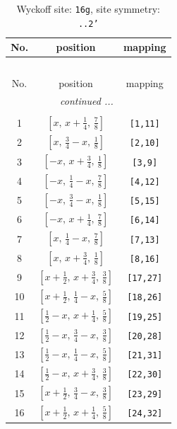 \documentclass[fleqn,8pt]{jsarticle}
\begin{document}
\renewcommand{\arraystretch}{1.2}
\begin{longtable}{ccc}
\caption{Wyckoff site: {\tt 16g}, site symmetry: {\tt ..2'}}
 \\
 \hline \hline
No. & position & mapping \\ \hline \endfirsthead

\multicolumn{2}{l}{\tablename\ \thetable{}} \\
 \hline \hline
No. & position & mapping \\ \hline \endhead

 \hline \hline
\multicolumn{2}{r}{\footnotesize\it continued ...} \\ \endfoot

 \hline \hline
\multicolumn{2}{r}{} \\ \endlastfoot

1 & $\left[ x,\, x + \frac{1}{4},\, \frac{7}{8} \right]$ & {\tt [1,11]} \\ \hline
2 & $\left[ x,\, \frac{3}{4} - x,\, \frac{1}{8} \right]$ & {\tt [2,10]} \\ \hline
3 & $\left[ - x,\, x + \frac{3}{4},\, \frac{1}{8} \right]$ & {\tt [3,9]} \\ \hline
4 & $\left[ - x,\, \frac{1}{4} - x,\, \frac{7}{8} \right]$ & {\tt [4,12]} \\ \hline
5 & $\left[ - x,\, \frac{3}{4} - x,\, \frac{1}{8} \right]$ & {\tt [5,15]} \\ \hline
6 & $\left[ - x,\, x + \frac{1}{4},\, \frac{7}{8} \right]$ & {\tt [6,14]} \\ \hline
7 & $\left[ x,\, \frac{1}{4} - x,\, \frac{7}{8} \right]$ & {\tt [7,13]} \\ \hline
8 & $\left[ x,\, x + \frac{3}{4},\, \frac{1}{8} \right]$ & {\tt [8,16]} \\ \hline
9 & $\left[ x + \frac{1}{2},\, x + \frac{3}{4},\, \frac{3}{8} \right]$ & {\tt [17,27]} \\ \hline
10 & $\left[ x + \frac{1}{2},\, \frac{1}{4} - x,\, \frac{5}{8} \right]$ & {\tt [18,26]} \\ \hline
11 & $\left[ \frac{1}{2} - x,\, x + \frac{1}{4},\, \frac{5}{8} \right]$ & {\tt [19,25]} \\ \hline
12 & $\left[ \frac{1}{2} - x,\, \frac{3}{4} - x,\, \frac{3}{8} \right]$ & {\tt [20,28]} \\ \hline
13 & $\left[ \frac{1}{2} - x,\, \frac{1}{4} - x,\, \frac{5}{8} \right]$ & {\tt [21,31]} \\ \hline
14 & $\left[ \frac{1}{2} - x,\, x + \frac{3}{4},\, \frac{3}{8} \right]$ & {\tt [22,30]} \\ \hline
15 & $\left[ x + \frac{1}{2},\, \frac{3}{4} - x,\, \frac{3}{8} \right]$ & {\tt [23,29]} \\ \hline
16 & $\left[ x + \frac{1}{2},\, x + \frac{1}{4},\, \frac{5}{8} \right]$ & {\tt [24,32]} \\
\end{longtable}
\end{document}
